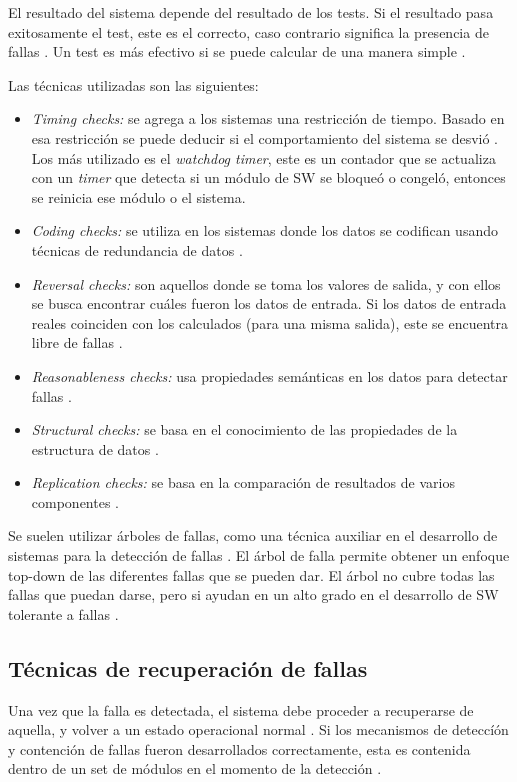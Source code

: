 El resultado del sistema depende del resultado de los tests. Si el resultado pasa exitosamente el 
test, este es el correcto, caso contrario significa la presencia de fallas \citep{FTDesign}. Un test 
es más efectivo si se puede calcular de una manera simple \citep{FTDesign}. 

Las técnicas utilizadas son las siguientes:
\begin{itemize}
 \item \textit{Timing checks:} se agrega a los sistemas una restricción de tiempo. Basado en esa 
restricción se puede deducir si el comportamiento del sistema se desvió \citep{FTDesign}. Los más 
utilizado es el \textit{watchdog timer}, este es un contador que se actualiza con un \textit{timer} que 
detecta si un módulo de \ac{SW} se bloqueó o congeló, entonces se reinicia ese módulo o el sistema. 
 \item \textit{Coding checks:} se utiliza en los sistemas donde los datos se codifican usando 
técnicas de redundancia de datos \citep{FTDesign}. 
 \item \textit{Reversal checks:} son aquellos donde se toma los valores de salida, y con ellos se 
busca encontrar cuáles fueron los datos de entrada. Si los datos de entrada reales coinciden con 
los calculados (para una misma salida), este se encuentra libre de fallas \citep{FTDesign}. 
 \item \textit{Reasonableness checks:} usa propiedades semánticas en los datos para detectar 
fallas \citep{FTDesign}. 
 \item \textit{Structural checks:} se basa en el conocimiento de las propiedades de la estructura 
de datos \citep{FTDesign}. 
 \item \textit{Replication checks: } se basa en la comparación de resultados de varios componentes 
\citep{SoftwareFaultToleranceATutorial}. 
\end{itemize}

Se suelen utilizar árboles de fallas, como una técnica auxiliar en el desarrollo de sistemas para 
la detección de fallas \citep{SoftwareFaultToleranceATutorial}. El árbol de falla permite obtener 
un enfoque top-down de las diferentes fallas que se pueden dar. El árbol no cubre todas las fallas 
que puedan darse, pero si ayudan en un alto grado en el desarrollo de \ac{SW} tolerante a fallas 
\citep{SoftwareFaultToleranceATutorial}. 

\subsection{Técnicas de recuperación de fallas}
Una vez que la falla es detectada, el sistema debe proceder a recuperarse de aquella, y volver a 
un estado operacional normal \citep{FTDesign}. Si los mecanismos de deteccíón y contención de 
fallas fueron desarrollados correctamente, esta es contenida dentro de un set de módulos en el 
momento de la detección \citep{FTDesign}. 

